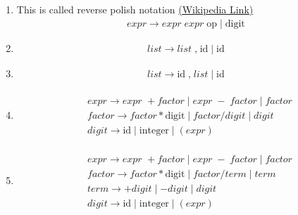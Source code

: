 \documentclass{article}
\begin{document}
\begin{enumerate}[label=\alph*)]
    \item This is called reverse polish notation \href{https://en.wikipedia.org/wiki/Reverse_Polish_notation}{(Wikipedia Link)}
    \begin{gather*}
        \textit{expr} \rightarrow \textit{expr}\;\textit{expr}\;\text{op} \mid \text{digit}
    \end{gather*}
    \item 
    \begin{gather*}
        \textit{list} \rightarrow \textit{list} \; \text{,} \;\text{id} \mid \text{id}
    \end{gather*}
    \item 
    \begin{gather*}
        \textit{list} \rightarrow \text{id}\;\text{,}\;\textit{list} \mid \text{id}
    \end{gather*}
    \item
    \begin{gather*}
        \begin{align*}
            &\textit{expr} \rightarrow \textit{expr } +  \textit{factor} \mid \textit{expr} \; - \; \textit{factor} \mid \textit{factor}\\
            &\textit{factor} \rightarrow \textit{factor} * \text{digit} \mid \textit{factor} / \textit{digit} \mid \textit{digit} \\
            &\textit{digit} \rightarrow \text{id} \mid \text{integer} \mid (\textit{expr})
        \end{align*}     
    \end{gather*}
    \item 
    \begin{gather*}
        \begin{align*}
            &\textit{expr} \rightarrow \textit{expr } +  \textit{factor} \mid \textit{expr} \; - \; \textit{factor} \mid \textit{factor}\\
            &\textit{factor} \rightarrow \textit{factor} * \text{digit} \mid \textit{factor} / \textit{term} \mid \textit{term} \\
            &\textit{term} \rightarrow + \textit{digit} \mid - \textit{digit} \mid \textit{digit} \\
            &\textit{digit} \rightarrow \text{id} \mid \text{integer} \mid (\textit{expr})
        \end{align*}     
    \end{gather*}
\end{enumerate}
\end{document}
